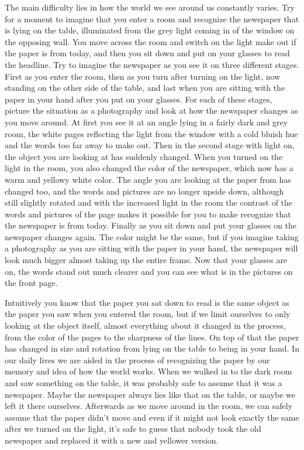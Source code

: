 The main difficulty lies in how the world we see around us constantly 
varies. Try for a moment to imagine that you enter a room and recognize 
the newspaper that is lying on the table, illuminated from the grey 
light coming in of the window on the opposing wall. You move across the 
room and switch on the light make out if the paper is from today, and 
then you sit down and put on your glasses to read the headline. Try to 
imagine the newspaper as you see it on three different stages. First as 
you enter the room, then as you turn after turning on the light, now 
standing on the other side of the table, and last when you are sitting 
with the paper in your hand after you put on your glasses. For each of 
these stages, picture the situation as a photography and look at how the 
newspaper changes as you move around. At first you see it at an angle 
lying in a fairly dark and grey room, the white pages reflecting the 
light from the window with a cold bluish hue and the words too far away 
to make out. Then in the second stage with light on, the object you are 
looking at has suddenly changed. When you turned on the light in the 
room, you also changed the color of the newspaper, which now has a warm 
and yellowy white color. The angle you are looking at the paper from has 
changed too, and the words and pictures are no longer upside down, 
although still slightly rotated and with the increased light in the room 
the contrast of the words and pictures of the page makes it possible for 
you to make recognize that the newspaper is from today. Finally as you 
sit down and put your glasses on the newspaper changes again. The color 
might be the same, but if you imagine taking a photography as you are 
sitting with the paper in your hand, the newspaper will look much bigger 
almost taking up the entire frame. Now that your glasses are on, the 
words stand out much clearer and you can see what is in the pictures on 
the front page.

Intuitively you know that the paper you sat down to read is the same 
object as the paper you saw when you entered the room, but if we limit 
ourselves to only looking at the object itself, almost everything about 
it changed in the process, from the color of the pages to the sharpness 
of the lines. On top of that the paper has changed in size and rotation 
from lying on the table to being in your hand. In our daily lives we are 
aided in the process of recognizing the paper by our memory and idea of 
how the world works. When we walked in to the dark room and saw 
something on the table, it was probably safe to assume that it was a 
newspaper. Maybe the newspaper always lies like that on the table, or 
maybe we left it there ourselves. Afterwards as we move around in the 
room, we can safely assume that the paper didn't move and even if it 
might not look exactly the same after we turned on the light, it's safe 
to guess that nobody took the old newspaper and replaced it with a new 
and yellower version.

